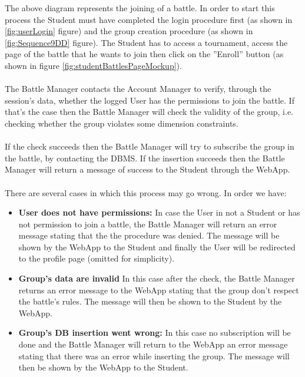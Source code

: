 \documentclass{article}
\begin{document}
{        The above diagram represents the joining of a battle. 
        In order to start this process the Student must have 
        completed the login procedure first (as shown in \ref{fig:userLogin} figure) and the
        group creation procedure (as shown in \ref{fig:Sequence9DD} figure). 
        The Student has to access a tournament, access 
        the page of the battle that he wants to join then
        click on the ”Enroll” button (as shown in figure \ref{fig:studentBattlesPageMockup}).
        \\ \\
        The Battle Manager contacts the Account Manager to verify, 
        through the session's data, whether the logged User has the 
        permissions to join the battle. If that's the case then the Battle 
        Manager will check the validity of the group, i.e. 
        checking whether the group violates some dimension constraints.
        \\ \\
        If the check succeeds then the Battle Manager will try to subscribe 
        the group in the battle, by contacting the DBMS.
        If the insertion succeeds then the Battle Manager will 
        return a message of success to the Student through the WebApp.
        \\ \\
        There are several cases in which this process may go wrong. In order we have:
        \begin{itemize}
            \item \textbf{User does not have permissions:} In case the User in not a Student 
            or has not permission to join a battle, the Battle Manager will return an 
            error message stating that the the procedure was denied. The message will be shown 
            by the WebApp to the Student and finally the User will be
            redirected to the profile page (omitted for simplicity).
            \item \textbf{Group's data are invalid} In this case after the check, the Battle
            Manager returns an error message to the WebApp stating that
            the group don't respect the battle's rules. The message will then be shown to the
            Student by the WebApp.
            \item \textbf{Group's DB insertion went wrong:} In this case no subscription will
            be done and the Battle Manager will return to the WebApp 
            an error message stating that there was an error while inserting the group. 
            The message will then be shown by the WebApp to the Student.
        \end{itemize}


}
\end{document}
